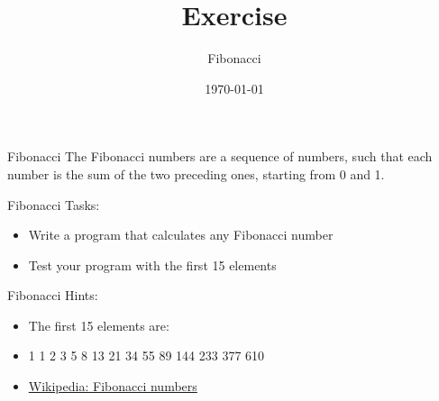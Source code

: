 


\title{Exercise}
\subtitle{Fibonacci}
\date{\today}




\begin{frame}
    \titlepage
\end{frame}

\begin{frame}{Fibonacci}
    The Fibonacci numbers are a sequence of numbers, such that each number is the sum of the two preceding ones, starting from 0 and 1.
\end{frame}

\begin{frame}{Fibonacci}
    Tasks:
    \begin{itemize}
        \item Write a program that calculates any Fibonacci number
        \item Test your program with the first 15 elements
    \end{itemize}
\end{frame}

\begin{frame}{Fibonacci}
    Hints:
    \begin{itemize}
        \item The first 15 elements are:
                \item 1 1 2 3 5 8 13 21 34 55 89 144 233 377 610
        \item \href{https://en.wikipedia.org/wiki/Fibonacci_number}{Wikipedia: Fibonacci numbers}
    \end{itemize}
\end{frame}



